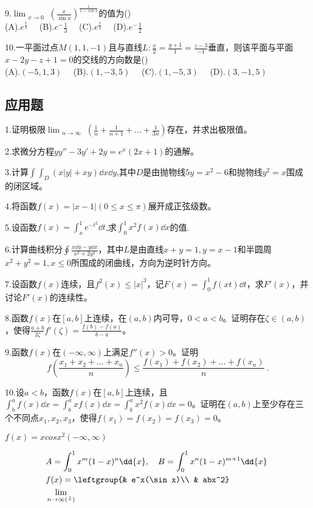 9.$\displaystyle \lim_{\substack{x \to 0}} (\frac{x}{\sin x})^{\frac{1}{1-\cos x}}$的值为()\\
(A).$e^\frac{1}{3}\quad$     (B).$e^-\frac{1}{3}\quad$    (C).$e^\frac{1}{2}\quad$      (D).$e^-\frac{1}{2}\quad$

10.一平面过点$M(1,1,-1)$且与直线$L:\frac{x}{2}=\frac{y+1}{1}=\frac{z-3}{-1}$垂直，则该平面与平面$x-2y-z+1=0$的交线的方向数是()\\
(A).$(-5,1,3)\quad$  (B).$(1,-3,5)\quad$  (C).$(1,-5,3)\quad$   (D).$(3,-1,5)\quad$

\subsection{应用题}
1.证明极限$\displaystyle \lim_{\substack {n \to \infty}}(\frac{1}{n}+\frac{1}{n+1}+ \dots +\frac{1}{3n})$存在，并求出极限值。

2.求微分方程$yy''-3y'+2y=e^x(2x+1)$的通解。

3.计算$\int \int_{D}(x|y|+xy)\dd{x}\dd{y}$,其中$D$是由抛物线$5y=x^2-6$和抛物线$y^2=x$围成的闭区域。

4.将函数$f(x)=|x-1| (0\leqslant x \leqslant \pi)$展开成正弦级数。

5.设函数$f(x)=\int_{x}^{1}e^{-t^2}\dd{t}$,求$\int_{0}^{1}x^2f(x)\dd{x}$的值.

6.计算曲线积分$\oint \frac{x\dd{y}-y\dd{x}}{x^2+2y^2}$，其中$L$是由直线$x+y=1,y=x-1$和半圆周$x^2+y^2=1,x \leqslant 0$所围成的闭曲线，方向为逆时针方向。

7.设函数$f(x)$连续，且$f^2(x) \leqslant {|x|}^3$，记$F(x)=\int_{0}^{1}f(xt)\dd{t}$，求$F'(x)$，并讨论$F'(x)$的连续性。

8.函数$f(x)$在$[a,b]$上连续，在$(a,b)$内可导，$0<a<b$。证明存在$\zeta \in(a,b)$，使得$\frac{a+b}{2\zeta}f'(\zeta)=\frac{f(b)-f(a)}{b-a}$。

9.函数$f(x)$在$(-\infty,\infty)$上满足$f''(x)>0$。证明
\begin{equation}
f(\frac{x_1+x_2+\dots+x_n}{n}) \leqslant \frac{f(x_1)+f(x_2)+\dots+f(x_n)}{n}~.
\end{equation}


10.设$a<b$，函数$f(x)$在$[a,b]$上连续，且$\int_{b}^{a}f(x)\dd{x}=\int_{b}^{a}xf(x)\dd{x}=\int_{b}^{a}x^2f(x)\dd{x}=0$。证明在$(a,b)$上至少存在三个不同点$x_1,x_2,x_3$，使得$f(x_1)=f(x_2)=f(x_3)=0$。



$f(x)=xcosx^2  (-\infty,\infty) $

\begin{equation}
\begin{aligned}
& A=\int_{0}^{1}x^m(1-x)^n\dd{x},\quad B=\int_0^1x^n(1-x)^{m+1}\dd{x} \\
& f(x)=\leftgroup{& e^x(\sin x)\\ & abx^2}~\\
& \lim_{n \to \infty(\frac{1}{})}
\end{aligned}~
\end{equation}
